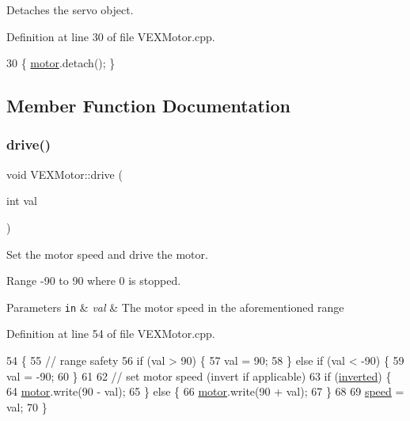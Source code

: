 Detaches the servo object. 



Definition at line 30 of file V\+E\+X\+Motor.\+cpp.


\begin{DoxyCode}
30 \{ \hyperlink{class_v_e_x_motor_a6cc23059af5cd57eafe31c900698d1a1}{motor}.detach(); \}
\end{DoxyCode}


\subsection{Member Function Documentation}
\mbox{\label{class_v_e_x_motor_ac8ab5c30e4be4a9e3ed290e7827bcf1a}} 
\subsubsection{\texorpdfstring{drive()}{drive()}}
{\footnotesize\ttfamily void V\+E\+X\+Motor\+::drive (\begin{DoxyParamCaption}\item[{int}]{val }\end{DoxyParamCaption})}



Set the motor speed and drive the motor. 

Range -\/90 to 90 where 0 is stopped. 
\begin{DoxyParams}[1]{Parameters}
\mbox{\tt in}  & {\em val} & The motor speed in the aforementioned range \\
\hline
\end{DoxyParams}


Definition at line 54 of file V\+E\+X\+Motor.\+cpp.


\begin{DoxyCode}
54                             \{
55     \textcolor{comment}{// range safety}
56     \textcolor{keywordflow}{if} (val > 90) \{
57         val = 90;
58     \} \textcolor{keywordflow}{else} \textcolor{keywordflow}{if} (val < -90) \{
59         val = -90;
60     \}
61 
62     \textcolor{comment}{// set motor speed (invert if applicable)}
63     \textcolor{keywordflow}{if} (\hyperlink{class_v_e_x_motor_ae0059b010c3c3185c43918cec2c021e8}{inverted}) \{
64         \hyperlink{class_v_e_x_motor_a6cc23059af5cd57eafe31c900698d1a1}{motor}.write(90 - val);
65     \} \textcolor{keywordflow}{else} \{
66         \hyperlink{class_v_e_x_motor_a6cc23059af5cd57eafe31c900698d1a1}{motor}.write(90 + val);
67     \}
68 
69     \hyperlink{class_v_e_x_motor_a6ab8752bef90d706c107826a436afa24}{speed} = val;
70 \}
\end{DoxyCode}
\mbox{\label{class_v_e_x_motor_a8e1dd31396f89ade88141685243cf8e7}} 
